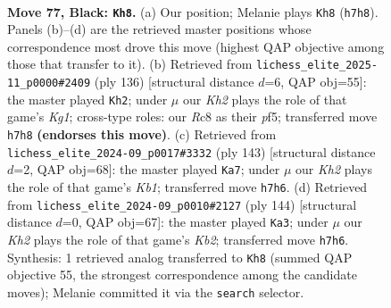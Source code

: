 \documentclass[11pt]{article}
\begin{document}
\clearpage

\begin{figure}[p]\centering
\begin{subfigure}{0.46\textwidth}\centering
\resizebox{\linewidth}{!}{%
\newchessgame
\chessboard[
  setfen={2r5/1R5k/8/8/5K2/8/3r3P/8 b - - 22 77},
  showmover=false,
  pgfstyle=straightmove, color=movearrow, markmove={h7-h8}
]}
\caption{}
\end{subfigure}\hfill
\begin{subfigure}{0.46\textwidth}\centering
\resizebox{\linewidth}{!}{%
\newchessgame
\chessboard[
  setfen={7R/8/8/5p2/8/5k2/8/1r4K1 w - - 2 69},
  showmover=false,
  pgfstyle=straightmove, color=movearrow, markmove={g1-h2}
]}
\caption{}
\end{subfigure}
\\[4pt]
\begin{subfigure}{0.46\textwidth}\centering
\resizebox{\linewidth}{!}{%
\newchessgame
\chessboard[
  setfen={1k5R/8/3K4/P7/8/r7/8/8 b - - 12 72},
  showmover=false,
  pgfstyle=straightmove, color=movearrow, markmove={b8-a7}
]}
\caption{}
\end{subfigure}\hfill
\begin{subfigure}{0.46\textwidth}\centering
\resizebox{\linewidth}{!}{%
\newchessgame
\chessboard[
  setfen={8/5R2/6R1/8/3k2p1/8/1K5r/8 w - - 6 73},
  showmover=false,
  pgfstyle=straightmove, color=movearrow, markmove={b2-a3}
]}
\caption{}
\end{subfigure}
\caption{\textbf{Move 77, Black: \texttt{Kh8}.} (a) Our position; Melanie plays \texttt{Kh8} (\texttt{h7h8}). Panels (b)--(d) are the retrieved master positions whose correspondence most drove this move (highest QAP objective among those that transfer to it). (b) Retrieved from \texttt{lichess\_elite\_2025-11\_p0000\#2409} (ply 136) [structural distance $d$=6, QAP obj=55]: the master played \texttt{Kh2}; under $\mu$ our \emph{Kh2} plays the role of that game's \emph{Kg1}; cross-type roles: our \emph{R}c8 as their \emph{p}f5; transferred move \texttt{h7h8} \textbf{(endorses this move)}. (c) Retrieved from \texttt{lichess\_elite\_2024-09\_p0017\#3332} (ply 143) [structural distance $d$=2, QAP obj=68]: the master played \texttt{Ka7}; under $\mu$ our \emph{Kh2} plays the role of that game's \emph{Kb1}; transferred move \texttt{h7h6}. (d) Retrieved from \texttt{lichess\_elite\_2024-09\_p0010\#2127} (ply 144) [structural distance $d$=0, QAP obj=67]: the master played \texttt{Ka3}; under $\mu$ our \emph{Kh2} plays the role of that game's \emph{Kb2}; transferred move \texttt{h7h6}. Synthesis: 1 retrieved analog transferred to \texttt{Kh8} (summed QAP objective 55, the strongest correspondence among the candidate moves); Melanie committed it via the \texttt{search} selector.}
\label{fig:thought-m153}
\end{figure}
\end{document}
